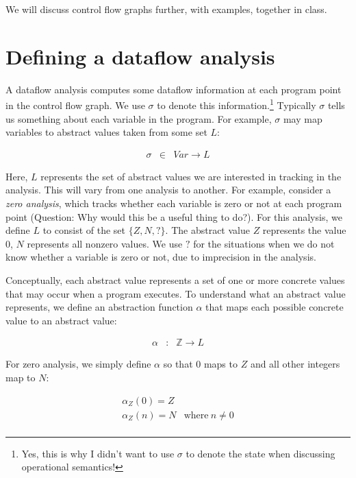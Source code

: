 \documentclass[11pt]{article}
\def\Integer{\mathbb{Z}}
\begin{document}
We will discuss control flow graphs further, with examples, together in class. 

\section{Defining a dataflow analysis}

A dataflow analysis computes some dataflow information at each program point in
the control flow graph. We use $\sigma$ to denote this
information.\footnote{Yes, this is why I didn't want to use $\sigma$ to denote the
  state when discussing operational semantics!}  Typically $\sigma$ tells us
something about each variable in the program.  For example, $\sigma$ may map
variables to abstract values taken from some set $L$:

\[
\begin{array}{lll}

\sigma & \in & \textit{Var} \rightarrow L

\end{array}
\]

Here, $L$ represents the set of abstract values we are interested in tracking in
the analysis.  This will vary from one analysis to another.  For example,
consider a \textit{zero analysis}, which tracks whether each variable is zero or
not at each program point (Question: Why would this be a useful thing to do?).
For this analysis, we define $L$ to consist of the set $\{Z, N, ?\}$.  The
abstract value $Z$ represents the value 0, $N$ represents all nonzero values.
We use $?$ for the situations when we do not know whether a variable is zero or
not, due to imprecision in the analysis.  

Conceptually, each abstract value represents a set of one or more concrete
values that may occur when a program executes.  To understand what an abstract
value represents, we define an abstraction function $\alpha$ that maps each
possible concrete value to an abstract value:

\[
\begin{array}{lll}

\alpha & : & \Integer \rightarrow L

\end{array}
\]

\noindent For zero analysis, we simply define $\alpha$ so that 0 maps to $Z$ and
all other integers map to $N$:

\[
\begin{array}{ll}

\alpha_Z(0) = Z \\
\alpha_Z(n) = N & \mbox{where}~ n \neq 0\\

\end{array}
\]
\end{document}
